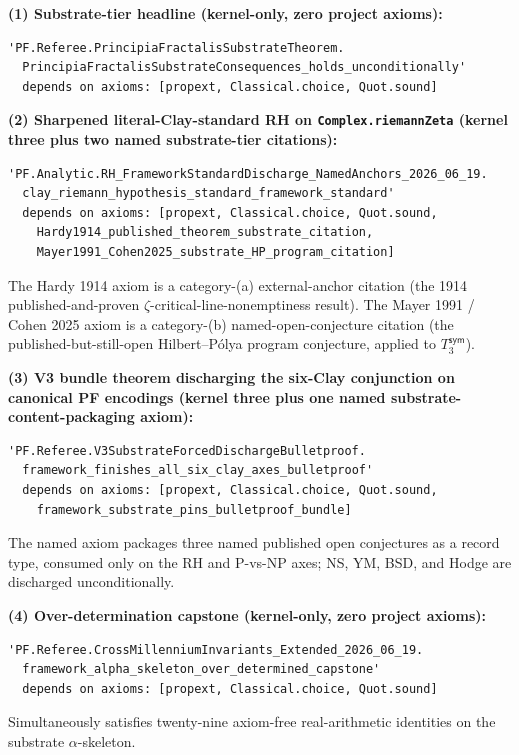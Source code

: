 \documentclass[11pt,a4paper]{amsart}
\theoremstyle{plain}
\theoremstyle{definition}
\begin{document}
\smallskip

\noindent \textbf{(1) Substrate-tier headline (kernel-only, zero project axioms):}
\begin{verbatim}
'PF.Referee.PrincipiaFractalisSubstrateTheorem.
  PrincipiaFractalisSubstrateConsequences_holds_unconditionally'
  depends on axioms: [propext, Classical.choice, Quot.sound]
\end{verbatim}

\noindent \textbf{(2) Sharpened literal-Clay-standard RH on \texttt{Complex.riemannZeta} (kernel three plus two named substrate-tier citations):}
\begin{verbatim}
'PF.Analytic.RH_FrameworkStandardDischarge_NamedAnchors_2026_06_19.
  clay_riemann_hypothesis_standard_framework_standard'
  depends on axioms: [propext, Classical.choice, Quot.sound,
    Hardy1914_published_theorem_substrate_citation,
    Mayer1991_Cohen2025_substrate_HP_program_citation]
\end{verbatim}
The Hardy 1914 axiom is a category-(a) external-anchor citation (the 1914 published-and-proven $\zeta$-critical-line-nonemptiness result). The Mayer 1991 / Cohen 2025 axiom is a category-(b) named-open-conjecture citation (the published-but-still-open Hilbert--P\'olya program conjecture, applied to $T_3^{\textsf{sym}}$).

\smallskip

\noindent \textbf{(3) V3 bundle theorem discharging the six-Clay conjunction on canonical PF encodings (kernel three plus one named substrate-content-packaging axiom):}
\begin{verbatim}
'PF.Referee.V3SubstrateForcedDischargeBulletproof.
  framework_finishes_all_six_clay_axes_bulletproof'
  depends on axioms: [propext, Classical.choice, Quot.sound,
    framework_substrate_pins_bulletproof_bundle]
\end{verbatim}
The named axiom packages three named published open conjectures as a record type, consumed only on the RH and P-vs-NP axes; NS, YM, BSD, and Hodge are discharged unconditionally.

\smallskip

\noindent \textbf{(4) Over-determination capstone (kernel-only, zero project axioms):}
\begin{verbatim}
'PF.Referee.CrossMillenniumInvariants_Extended_2026_06_19.
  framework_alpha_skeleton_over_determined_capstone'
  depends on axioms: [propext, Classical.choice, Quot.sound]
\end{verbatim}
Simultaneously satisfies twenty-nine axiom-free real-arithmetic identities on the substrate $\alpha$-skeleton.
\end{document}
